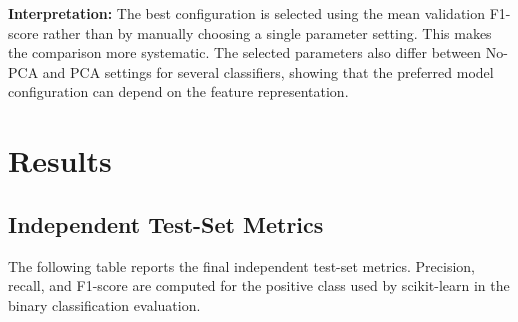 \documentclass[12pt,a4paper]{article}
\begin{document}
\textbf{Interpretation:} The best configuration is selected using the mean validation F1-score rather than by manually choosing a single parameter setting. This makes the comparison more systematic. The selected parameters also differ between No-PCA and PCA settings for several classifiers, showing that the preferred model configuration can depend on the feature representation.

\section{Results}

\subsection{Independent Test-Set Metrics}
The following table reports the final independent test-set metrics. Precision, recall, and F1-score are computed for the positive class used by scikit-learn in the binary classification evaluation.
\end{document}
